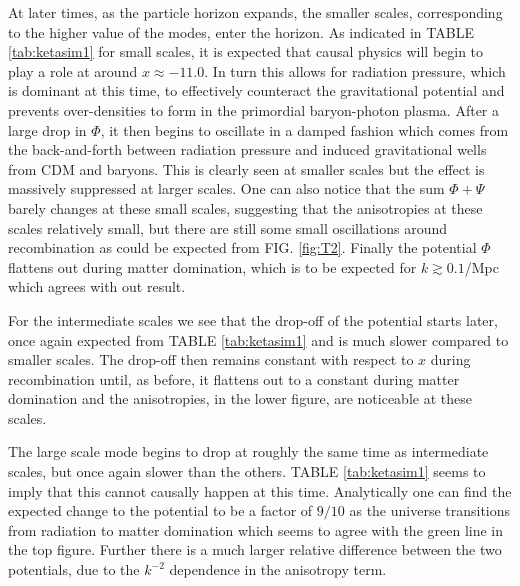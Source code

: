 \documentclass[%
reprint,
 amsmath,amssymb,
 aps,
]{revtex4-2}
\begin{document}
At later times, as the particle horizon expands, the smaller scales, corresponding to the higher value of the modes, enter the horizon. As indicated in TABLE \ref{tab:ketasim1} for small scales, it is expected that causal physics will begin to play a role at around $x\approx -11.0$. In turn this allows for radiation pressure, which is dominant at this time, to effectively counteract the gravitational potential and prevents over-densities to form in the primordial baryon-photon plasma. After a large drop in $\Phi$, it then begins to oscillate in a damped fashion which comes from the back-and-forth between radiation pressure and induced gravitational wells from CDM and baryons. This is clearly seen at smaller scales but the effect is massively suppressed at larger scales. One can also notice that the sum $\Phi+\Psi$ barely changes at these small scales, suggesting that the anisotropies at these scales relatively small, but there are still some small oscillations around recombination as could be expected from FIG. \ref{fig:T2}. Finally the potential $\Phi$ flattens out during matter domination, which is to be expected for $k\gtrsim0.1$/Mpc which agrees with out result. 

For the intermediate scales we see that the drop-off of the potential starts later, once again expected from TABLE \ref{tab:ketasim1} and is much slower compared to smaller scales. The drop-off then remains constant with respect to $x$ during recombination until, as before, it flattens out to a constant during matter domination and the anisotropies, in the lower figure, are noticeable at these scales. 

The large scale mode begins to drop at roughly the same time as intermediate scales, but once again slower than the others. TABLE \ref{tab:ketasim1} seems to imply that this cannot causally happen at this time. Analytically one can find the expected change to the potential to be a factor of $9/10$ as the universe transitions from radiation to matter domination \cite{AST5220LectureNotes} which seems to agree with the green line in the top figure. Further there is a much larger relative difference between the two potentials, due to the $k^{-2}$ dependence in the anisotropy term.
\end{document}
